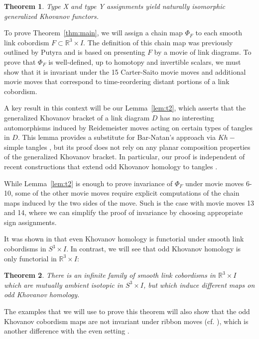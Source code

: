 \documentclass[12pt]{amsart}
\theoremstyle{definition}
\theoremstyle{plain}
\newtheorem{theorem}{Theorem}
\begin{document}
\begin{theorem}\label{thm:equivalence}
Type X and type Y assignments yield naturally isomorphic generalized Khovanov functors.
\end{theorem}

To prove Theorem~\ref{thm:main}, we will assign a chain map $\Phi_F$
to each smooth link cobordism $F\subset\mathbb{R}^3\times I$.
The definition of this chain map was previously outlined by Putyra \cite{Pu2015}
and is based on presenting $F$ by a movie of link diagrams.
To prove that $\Phi_F$ is well-defined, up to homotopy and invertible scalars,
we must show that it is invariant under the 15 Carter-Saito movie moves \cite{CS1997}
and additional movie moves that correspond to time-reordering distant portions of a link cobordism.

A key result in this context will be our Lemma~\ref{lem:t2}, which asserts that the generalized Khovanov bracket
of a link diagram $D$ has no interesting automorphisms induced by Reidemeister moves acting
on certain types of tangles in $D$. This lemma provides a substitute for Bar-Natan's approach via
$Kh-$simple tangles \cite{Bn2005}, but its proof does not rely on any
planar composition properties of the generalized Khovanov bracket. In particular,
our proof is independent of recent constructions that extend odd Khovanov homology
to tangles \cite{NP2020,SV2023,Sp2024}.

While Lemma~\ref{lem:t2} is enough to prove invariance of $\Phi_F$ under movie moves 6-10,
some of the other movie moves require explicit computations of the chain maps induced by the
two sides of the move. Such is the case with movie moves 13 and 14, where we can simplify the
proof of invariance by choosing appropriate sign assignments.

It was shown in  \cite{MWW2022} that even Khovanov homology is functorial under smooth link cobordisms in $S^3\times I$.
In contrast,
we will see that odd Khovanov homology is only functorial in $\mathbb{R}^3\times I$:

\begin{theorem}\label{thm:noninvariance} 
There is an infinite family of smooth link cobordisms in $\mathbb{R}^3\times I$ which are mutually ambient isotopic in $S^3\times I$, but which induce different maps on odd Khovanov homology.
\end{theorem}

The examples that we will use to prove this theorem will also show that the odd Khovanov cobordism
maps are not invariant under ribbon moves (cf.  \cite{Og2000}), which is
another difference with the even setting \cite{CSS2006}.
\end{document}
